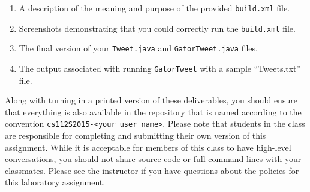   \begin{enumerate} 
    \item A description of the meaning and purpose of the provided {\tt build.xml} file.
    
    \item Screenshots demonstrating that you could correctly run the {\tt build.xml} file.
    
    \item The final version of your {\tt Tweet.java} and {\tt GatorTweet.java} files.
    
    \item The output associated with running {\tt GatorTweet} with a sample ``Tweets.txt'' file. 
  
  \end{enumerate}

  Along with turning in a printed version of these deliverables, you should ensure that everything is also available in
  the repository that is named according to the convention {\tt cs112S2015-<your user name>}. Please note that students
  in the class are responsible for completing and submitting their own version of this assignment.    While it is
  acceptable for members of this class to have high-level conversations, you should not share source code or full
  command lines with your classmates.  Please see the instructor if you have questions about the policies for this
  laboratory assignment.

  
